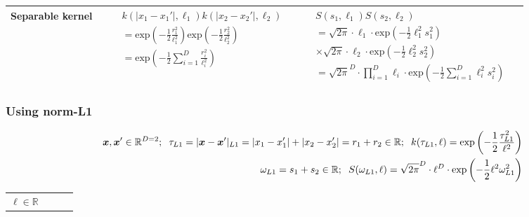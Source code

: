 \documentclass[onecolumn,a4paper,11pt]{article}
\begin{document}
\begin{landscape}
\begin{table}[H]
\begin{center}
\begin{tabular}{|c|c|c|c|}
{       {Separable kernel} 
       }
       
        & \multicolumn{1}{|p{7.2cm}|}{\small
         \begin{eqnarray*}
		&&k(|x_1-x_1'|,\ell_1)k(|x_2-x_2'|,\ell_2) \\
		&&= \mathrm{exp}\left(-\frac{1}{2} \frac{r_1^2}{\ell_1^2} \right) \mathrm{exp}\left(-\frac{1}{2} \frac{r_2^2}{\ell_2^2} \right) \\
		&&=\mathrm{exp}\left(-\frac{1}{2} \sum_{i=1}^{D}\frac{r_i^2}{\ell_i^2} \right)
         \end{eqnarray*}
       }
       
       & \multicolumn{1}{|p{8.2cm}|}{\small
         \begin{eqnarray*}
         &&S(s_1,\ell_1)S(s_2,\ell_2) \\
		&&= \sqrt{2\pi} \cdot \ell_1 \cdot \mathrm{exp}\left(-\frac{1}{2} \ell_1^2 s_1^2 \right) \\
		 &&\times  \sqrt{2\pi} \cdot \ell_2 \cdot \mathrm{exp}\left(-\frac{1}{2} \ell_2^2 s_2^2 \right)\\
		&&= \sqrt{2\pi}^D \cdot \prod_{i=1}^D \ell_i \cdot \mathrm{exp}\left(-\frac{1}{2} \sum_{i=1}^D \ell_i^2 s_i^2 \right)
         \end{eqnarray*}         
       } 

       & \multicolumn{1}{|p{6.2cm}|}{\small

       } \\ 
       
       \hline
    \end{tabular}
  \end{center}
\end{table}


\newpage
\subsubsection{Using norm-L1 }
\vspace{-10mm}

\begin{table}[H]
\small
\begin{eqnarray*}
\vspace{-20mm}
&&\bm{x}, \bm{x}' \in \mathbb{R}^{D=2}; \hspace{2mm}\tau_{L1} =|\bm{x}-\bm{x}'|_{L1} = |x_1-x_1'|+|x_2-x_2'| = r_1+r_2 \in \mathbb{R}; \hspace{2mm} k(\tau_{L1},\ell) = \mathrm{exp}\left(-\frac{1}{2} \frac{\tau_{L1}^2}{\ell^2} \right)\\
&& \omega_{L1}= s_1+s_2 \in \mathbb{R}; \hspace{2mm} S(\omega_{L1},\ell) = \sqrt{2\pi}^D \cdot \ell^D \cdot \mathrm{exp}\left(-\frac{1}{2} \ell^2 \omega_{L1}^2 \right)
\end{eqnarray*}
\normalsize
  \begin{center}
    \begin{tabular}{|c|c|c|c|}
       \hline
       \multicolumn{1}{|p{1.5cm}|}{
       \vspace{1mm}
       $\ell \in \mathbb{R}$
       }
       

\end{tabular}
\end{center}
\end{table}
\end{landscape}
\end{document}
